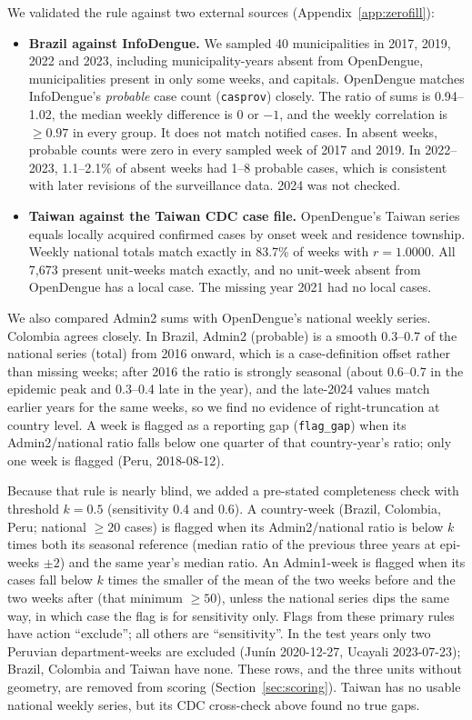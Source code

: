 \documentclass[11pt]{article}
\begin{document}
We validated the rule against two external sources (Appendix~\ref{app:zerofill}):
\begin{itemize}
  \item \textbf{Brazil against InfoDengue.} \citep{codeco2018infodengue,infodengue_api} We sampled 40
  municipalities in 2017, 2019, 2022 and 2023, including municipality-years absent from
  OpenDengue, municipalities present in only some weeks, and capitals. OpenDengue matches InfoDengue's
  \emph{probable} case count (\texttt{casprov}) closely. The ratio of sums is 0.94--1.02, the median
  weekly difference is 0 or $-1$, and the weekly correlation is $\geq 0.97$ in every group. It does
  not match notified cases. In absent weeks, probable counts were zero in every
  sampled week of 2017 and 2019. In 2022--2023, 1.1--2.1\% of absent weeks had 1--8 probable cases,
  which is consistent with later revisions of the surveillance data. 2024 was not checked.
  \item \textbf{Taiwan against the Taiwan CDC case file.} \citep{taiwancdc_dengue_daily} OpenDengue's Taiwan series equals locally acquired confirmed cases by onset week and residence
  township. Weekly national totals match exactly in 83.7\% of weeks with $r=1.0000$. All 7{,}673 present unit-weeks match exactly, and
  no unit-week absent from OpenDengue has a local case. The missing year 2021 had no local cases.
\end{itemize}
We also compared Admin2 sums with OpenDengue's national weekly series. Colombia agrees closely.
In Brazil, Admin2 (probable) is a smooth 0.3--0.7 of the national series (total) from 2016 onward,
which is a case-definition offset rather than missing weeks; after 2016 the ratio is strongly seasonal
(about 0.6--0.7 in the epidemic peak and 0.3--0.4 late in the year), and the late-2024 values match
earlier years for the same weeks, so we find no evidence of right-truncation at country level. A week is
flagged as a reporting gap (\texttt{flag\_gap}) when its Admin2/national ratio falls below one quarter of
that country-year's ratio; only one week is flagged (Peru, 2018-08-12).

Because that rule is nearly blind, we added a pre-stated completeness check with threshold $k=0.5$
(sensitivity 0.4 and 0.6). A country-week (Brazil, Colombia, Peru; national $\geq 20$ cases) is flagged
when its Admin2/national ratio is below $k$ times both its seasonal reference (median ratio of the previous
three years at epi-weeks $\pm 2$) and the same year's median ratio. An Admin1-week is flagged when its
cases fall below $k$ times the smaller of the mean of the two weeks before and the two weeks after (that
minimum $\geq 50$), unless the national series dips the same way, in which case the flag is for
sensitivity only. Flags from these primary rules have action ``exclude''; all others are
``sensitivity''. In the test years only two Peruvian department-weeks are excluded (Jun\'in 2020-12-27,
Ucayali 2023-07-23); Brazil, Colombia and Taiwan have none. These rows, and the three units without
geometry, are removed from scoring (Section~\ref{sec:scoring}). Taiwan has no usable national weekly
series, but its CDC cross-check above found no true gaps.
\end{document}
